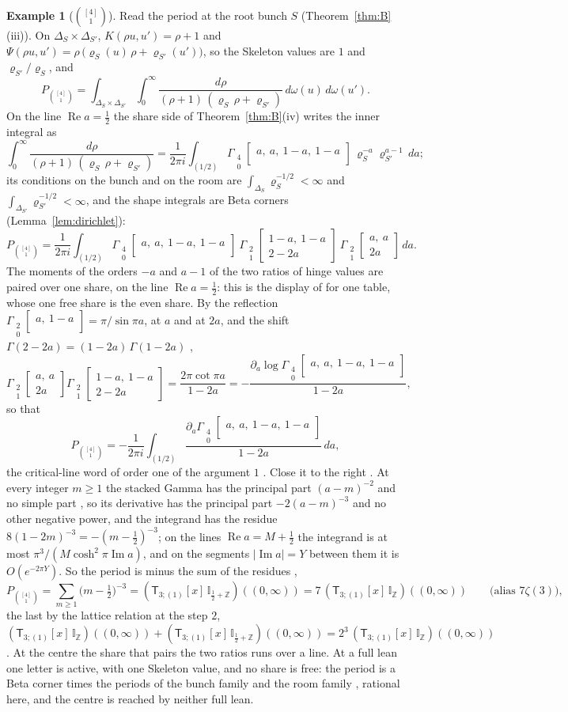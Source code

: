 \documentclass[11pt]{article}
\theoremstyle{plain}
\theoremstyle{definition}
\newtheorem{example}[prop]{Example}
\theoremstyle{remark}
\newcommand{\Z}{\mathbb Z}
\newcommand{\sT}{\mathsf T}
\newcommand{\Gst}[4]{\Gamma_{\substack{#1\\#2}}\!\begin{bmatrix}#3\\#4\end{bmatrix}}
\newcommand{\IZ}{\mathbb I_{\mathbb Z}}
\newcommand{\Ilat}[1]{\mathbb I_{#1}}
\newcommand{\Tx}[3]{(\sT_{#1;(1)}[x]\,#2)((#3,\infty))}
\DeclareMathOperator{\re}{Re}
\DeclareMathOperator{\im}{Im}
\begin{document}
\begin{example}[$\binom{[4]}1$]
Read the period at the root bunch $S$ (Theorem~\ref{thm:B}(iii)). On $\Delta_S\times\Delta_{S'}$, $K(\rho u,u')=\rho+1$ and $\Psi(\rho u,u')=\rho\,\big(\varrho_S(u)\,\rho+\varrho_{S'}(u')\big)$, so the Skeleton values are $1$ and $\varrho_{S'}/\varrho_S$, and
\[
P_{\binom{[4]}1}=\int_{\Delta_S\times\Delta_{S'}}\int_0^\infty\frac{d\rho}{(\rho+1)\,(\varrho_S\,\rho+\varrho_{S'})}\,d\omega(u)\,d\omega(u').
\]
On the line $\re a=\frac12$ the share side of Theorem~\ref{thm:B}(iv) writes the inner integral as
\[
\int_0^\infty\frac{d\rho}{(\rho+1)\,(\varrho_S\,\rho+\varrho_{S'})}=\frac1{2\pi i}\int_{(1/2)}\Gst40{a,\ a,\ 1-a,\ 1-a}{}\,\varrho_S^{-a}\varrho_{S'}^{a-1}\,da;
\]
its conditions on the bunch and on the room are $\int_{\Delta_S}\varrho_S^{-1/2}<\infty$ and $\int_{\Delta_{S'}}\varrho_{S'}^{-1/2}<\infty$, and the shape integrals are Beta corners (Lemma~\ref{lem:dirichlet}):
\begin{equation}\label{eq:U14share}
P_{\binom{[4]}1}=\frac1{2\pi i}\int_{(1/2)}\Gst40{a,\ a,\ 1-a,\ 1-a}{}\ \Gst21{1-a,\ 1-a}{2-2a}\ \Gst21{a,\ a}{2a}\,da .
\end{equation}
The moments of the orders $-a$ and $a-1$ of the two ratios of hinge values are paired over one share, on the line $\re a=\frac12$: this is the display of \cite[Thm.~18.13, p.~119]{F} for one table, whose one free share is the even share. By the reflection $\Gst20{a,\ 1-a}{}=\pi/\sin\pi a$, at $a$ and at $2a$, and the shift $\Gamma(2-2a)=(1-2a)\,\Gamma(1-2a)$ \cite[Prop.~1.3, p.~11]{F},
\[
\Gst21{a,\ a}{2a}\Gst21{1-a,\ 1-a}{2-2a}=\frac{2\pi\cot\pi a}{1-2a}=-\frac{\partial_a\log\Gst40{a,\ a,\ 1-a,\ 1-a}{}}{1-2a},
\]
so that
\[
P_{\binom{[4]}1}=-\frac1{2\pi i}\int_{(1/2)}\frac{\partial_a\Gst40{a,\ a,\ 1-a,\ 1-a}{}}{1-2a}\,da,
\]
the critical-line word of order one of the argument $1$ \cite[Def.~33.3, p.~298]{F}. Close it to the right \cite[Thm.~4.5, p.~26]{F}. At every integer $m\ge1$ the stacked Gamma has the principal part $(a-m)^{-2}$ and no simple part \cite[Lemma~5.16, p.~34]{F}, so its derivative has the principal part $-2(a-m)^{-3}$ and no other negative power, and the integrand has the residue $8(1-2m)^{-3}=-(m-\frac12)^{-3}$; on the lines $\re a=M+\frac12$ the integrand is at most $\pi^3/(M\cosh^2\pi\im a)$, and on the segments $|\im a|=Y$ between them it is $O(e^{-2\pi Y})$. So the period is minus the sum of the residues \cite[Thm.~33.6, p.~298]{F},
\[
P_{\binom{[4]}1}=\sum_{m\ge1}\big(m-\tfrac12\big)^{-3}=\Tx{3}{\Ilat{\frac12+\Z}}{0}=7\,\Tx{3}{\IZ}{0}\qquad\text{(alias $7\zeta(3)$)},
\]
the last by the lattice relation at the step $2$, $\Tx{3}{\IZ}{0}+\Tx{3}{\Ilat{\frac12+\Z}}{0}=2^3\,\Tx{3}{\IZ}{0}$ \cite[Thm.~5.12(i), p.~32]{F}. At the centre the share that pairs the two ratios runs over a line. At a full lean one letter is active, with one Skeleton value, and no share is free: the period is a Beta corner times the periods of the bunch family and the room family \cite[Thm.~18.13, p.~119; Cor.~18.14, p.~121]{F}, rational here, and the centre is reached by neither full lean.
\end{example}
\end{document}
